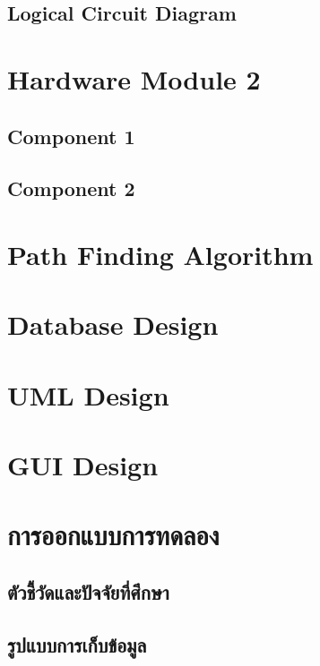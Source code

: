 \documentclass[12pt,oneside,openright,a4paper]{cpe-thai-project}
\begin{document}
\subsection{Logical Circuit Diagram}

\section{Hardware Module 2}
\subsection{Component 1}

\subsection{Component 2}

\section{Path Finding Algorithm}

\section{Database Design}

\section{UML Design}

\section{GUI Design}

\section{การออกแบบการทดลอง}
\subsection{ตัวชี้วัดและปัจจัยที่ศึกษา}
\subsection{รูปแบบการเก็บข้อมูล}




\end{document}
